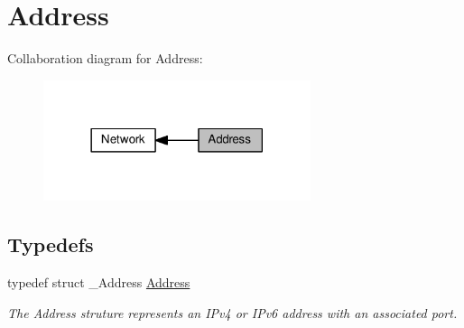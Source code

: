\hypertarget{group__address}{}\section{Address}
\label{group__address}
Collaboration diagram for Address\+:\nopagebreak
\begin{figure}[H]
\begin{center}
\leavevmode
\includegraphics[width=222pt]{group__address}
\end{center}
\end{figure}
\subsection*{Typedefs}
\begin{DoxyCompactItemize}
\item 
\mbox{\label{group__address_ga80f2dcdb3778441e85ac8c9dbb6f324a}} 
typedef struct \+\_\+\+Address \hyperlink{group__address_ga80f2dcdb3778441e85ac8c9dbb6f324a}{Address}
\begin{DoxyCompactList}\small\item\em The Address struture represents an I\+Pv4 or I\+Pv6 address with an associated port. \end{DoxyCompactList}\end{DoxyCompactItemize}
